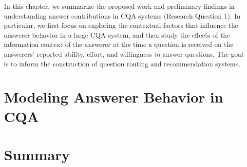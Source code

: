 %

\newif\ifcompress
\compresstrue   %
\compressfalse %



\noindent 
In this chapter, we summarize the proposed work and preliminary findings in understanding answer contributions in CQA systems (Research Question 1). In particular, we first focus on exploring the contextual factors that influence the answerer behavior in a large CQA system, and then study the effects of the information context of the answerer at the time a question is received on the answerers' reported ability, effort, and willingness to answer questions.  The goal is to inform the construction of question routing and recommendation systems.


\section{Modeling Answerer Behavior in CQA}


\section{Summary}

